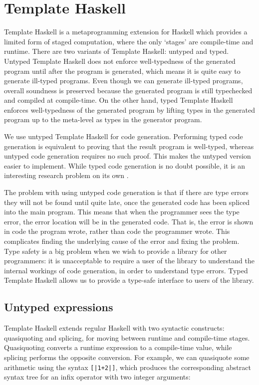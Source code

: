 \section{Template Haskell}
Template Haskell is a metaprogramming extension for Haskell \cite{sheard2002template} which provides a limited form of staged computation, where the only `stages' are compile-time and runtime.
There are two variants of Template Haskell: untyped and typed.
Untyped Template Haskell does not enforce well-typedness of the generated program until after the program is generated, which means it is quite easy to generate ill-typed programs.
Even though we can generate ill-typed programs, overall soundness is preserved because the generated program is still typechecked and compiled at compile-time.
On the other hand, typed Template Haskell enforces well-typedness of the generated program by lifting types in the generated program up to the meta-level as types in the generator program.

We use untyped Template Haskell for code generation.
Performing typed code generation is equivalent to proving that the result program is well-typed, whereas untyped code generation requires no such proof.
This makes the untyped version easier to implement.
While typed code generation is no doubt possible, it is an interesting research problem on its own .

The problem with using untyped code generation is that if there are type errors they will not be found until quite late, once the generated code has been spliced into the main program.
This means that when the programmer sees the type error, the error location will be in the generated code.
That is, the error is shown in code the program wrote, rather than code the programmer wrote.
This complicates finding the underlying cause of the error and fixing the problem.
Type safety is a big problem when we wish to provide a library for other programmers: it is unacceptable to require a user of the library to understand the internal workings of code generation, in order to understand type errors.
Typed Template Haskell allows us to provide a type-safe interface to users of the library.

\subsection{Untyped expressions}

Template Haskell extends regular Haskell with two syntactic constructs: quasiquoting and splicing, for moving between runtime and compile-time stages.
Quasiquoting converts a runtime expression to a compile-time value, while splicing performs the opposite conversion.
For example, we can quasiquote some arithmetic using the syntax \lstinline/[|1+2|]/, which produces the corresponding abstract syntax tree for an infix operator with two integer arguments:

